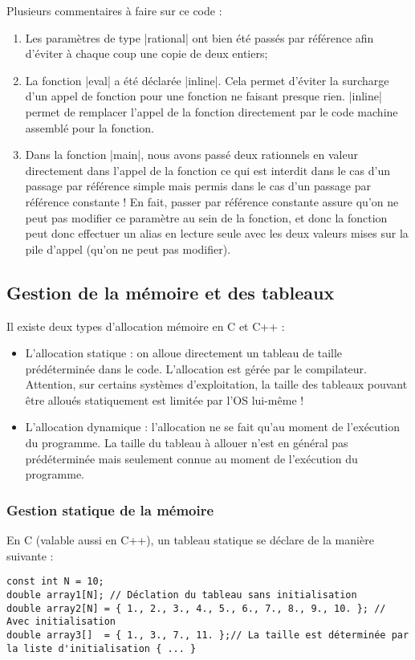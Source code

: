 Plusieurs commentaires à faire sur ce code :
\begin{enumerate}
    \item Les paramètres de type |rational| ont bien été passés par référence afin d'éviter à chaque coup une copie de deux entiers;
    \item La fonction |eval| a été déclarée |inline|. Cela permet d'éviter la surcharge d'un appel de fonction pour une fonction ne faisant presque rien. |inline| permet de remplacer l'appel de la fonction directement par le code machine assemblé pour la fonction. 
    \item Dans la fonction |main|, nous avons passé deux rationnels en valeur directement dans l'appel de la fonction ce qui est interdit dans le cas d'un passage par référence simple mais permis dans le cas d'un passage par référence constante ! En fait, passer par référence constante assure qu'on ne peut pas modifier ce paramètre au sein de la fonction, et donc la fonction peut donc effectuer un alias en lecture seule avec les deux valeurs mises sur la pile d'appel (qu'on ne peut pas modifier).
\end{enumerate}

\subsection{Gestion de la mémoire et des tableaux}

Il existe deux types d'allocation mémoire en C et C++ : 
\begin{itemize}
    \item L'allocation statique : on alloue directement un tableau de taille prédéterminée dans le code. L'allocation est gérée par le compilateur. Attention, sur certains systèmes d'exploitation, la taille des tableaux pouvant être alloués 
    statiquement est limitée par l'OS lui-même !
    \item L'allocation dynamique : l'allocation ne se fait qu'au moment de l'exécution du programme. La taille du tableau à allouer n'est en général pas prédéterminée mais seulement connue au moment de l'exécution du programme.
\end{itemize}

\subsubsection{Gestion statique de la mémoire}

En C (valable aussi en C++), un tableau statique se déclare de la manière suivante :
\begin{lstlisting}[caption=Allocation statique d'un tableau en C/C++]
const int N = 10;
double array1[N]; // Déclation du tableau sans initialisation
double array2[N] = { 1., 2., 3., 4., 5., 6., 7., 8., 9., 10. }; // Avec initialisation
double array3[]  = { 1., 3., 7., 11. };// La taille est déterminée par la liste d'initialisation { ... }
\end{lstlisting}

